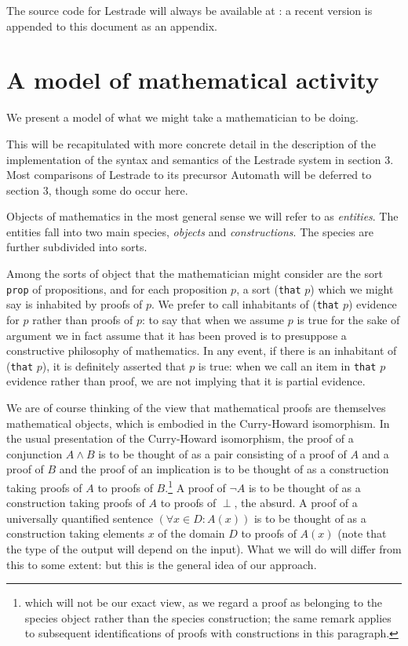 \documentclass[12pt]{article}
\begin{document}
The source code for Lestrade will always be available at \cite{holmessource}:  a recent version is appended to this document as an appendix.

\newpage

\section{A model of mathematical activity}

We present a model of what we might take a mathematician to be doing.

This will be recapitulated with more concrete detail in the description of the implementation of the syntax and semantics of the Lestrade system in section 3.  Most comparisons of Lestrade to its precursor Automath will be deferred to section 3, though some do occur here.

Objects of mathematics in the most general sense we will refer to as {\em entities\/}.  The entities fall into two main species, {\em objects} and {\em constructions}.  The species are further subdivided into sorts.

Among the sorts of object that the mathematician might consider are the sort {\tt prop} of propositions, and for each proposition $p$,
a sort ({\tt that} $p$) which we might say is inhabited by proofs of $p$.  We prefer to call inhabitants of ({\tt that} $p$) evidence for $p$ rather than proofs of $p$:  to say that when we assume $p$ is true for the sake of argument we in fact assume that it has been proved is to presuppose a constructive philosophy of mathematics.  In any event, if there is an inhabitant of ({\tt that} $p$), it is definitely asserted that $p$ is true:  when we call an item in {\tt that} $p$ evidence rather than proof, we are not implying that it is partial evidence.

We are of course thinking of the view that mathematical proofs are themselves mathematical objects, which is embodied in the Curry-Howard isomorphism.  In the usual presentation of the Curry-Howard isomorphism, the proof of a conjunction
$A \wedge B$ is to be thought of as a pair consisting of a proof of $A$ and a proof of $B$ and the  proof of an implication is to be thought of as a construction taking proofs of $A$ to proofs of $B$.\footnote{which will not be our exact view, as we regard a proof as belonging to the species object rather than the species construction; the same remark applies to subsequent identifications of proofs with constructions in this paragraph.}
A proof of $\neg A$ is to be thought of as a construction taking proofs of $A$ to proofs of $\perp$, the absurd.  A proof of a universally quantified sentence $(\forall x \in D:A(x))$ is to be thought of as a construction taking elements $x$ of the domain $D$ to proofs of $A(x)$ (note that the type of the output will depend on the input).  What we will do will differ from this to some extent:  but this is the general idea of our approach.
\end{document}
